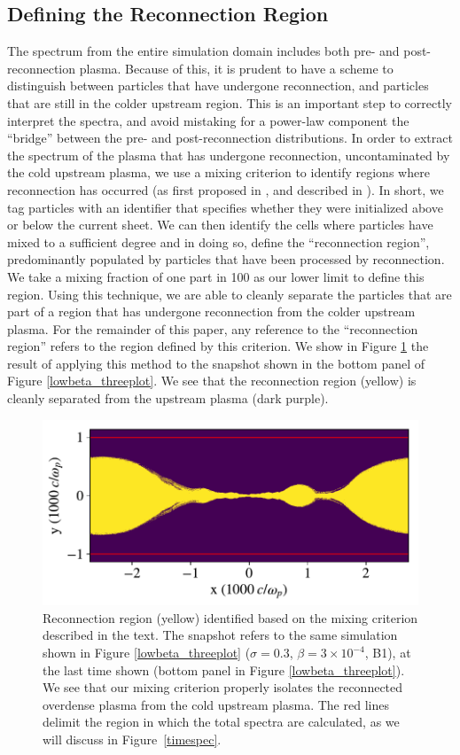\subsection{Defining the Reconnection Region}
The spectrum from the entire simulation domain includes both pre- and post-reconnection plasma.  Because of this, it is prudent to have a scheme to distinguish between particles that have undergone reconnection, and particles that are still in the colder upstream region.  This is an important step to correctly interpret the spectra, and avoid mistaking for a power-law component the ``bridge'' between the pre- and post-reconnection distributions.
In order to extract the spectrum of the plasma that has undergone reconnection, uncontaminated by the cold upstream plasma, we use a mixing criterion to identify regions where reconnection has occurred (as first proposed in \citealt{daughton2014}, and described in \citet{rowan2017}).  In short, we tag particles with an identifier that specifies whether they were initialized above or below the current sheet.  We can then identify the cells where particles have mixed to a sufficient degree and in doing so, define the ``reconnection region'', predominantly populated by particles that have been processed by reconnection.   We take a mixing fraction of one part in 100 as our lower limit to define this region.  Using this technique, we are able to cleanly separate the particles that are part of a region that has undergone reconnection from the colder upstream plasma. For the remainder of this paper, any reference to the ``reconnection region'' refers to the region defined by this criterion.  We show in Figure \ref{regions} the result of applying this method to the snapshot shown in the bottom panel of Figure \ref{lowbeta_threeplot}.  We see that the reconnection region (yellow) is cleanly separated from the upstream plasma (dark purple).

\begin{figure}[!h]
	\centering
\includegraphics[width=\linewidth]{regions_test.pdf}
\caption{Reconnection region (yellow) identified based on the mixing criterion described in the text. The snapshot refers to the same simulation shown in Figure \ref{lowbeta_threeplot} ($\sigma=0.3$, $\beta=3\times 10^{-4}$, B1), at the last time shown (bottom panel in Figure \ref{lowbeta_threeplot}).  We see that our mixing criterion properly isolates the reconnected overdense plasma from the cold upstream plasma.  The red lines delimit the region in which the total spectra are calculated, as we will discuss in Figure~\ref{timespec}.}
\label{regions}
\end{figure}


